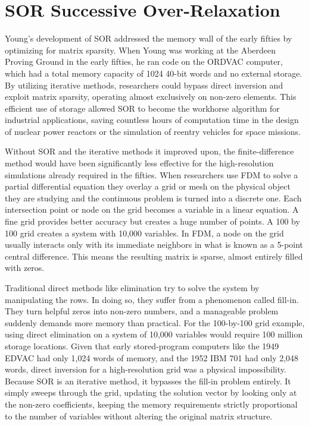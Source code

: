 \section{SOR Successive Over-Relaxation}

Young’s development of SOR addressed the memory wall of the early fifties by optimizing for matrix sparsity. When Young was working at the Aberdeen Proving Ground in the early fifties, he ran code on the ORDVAC computer, which had a total memory capacity of 1024 40-bit words and no external storage. By utilizing iterative methods, researchers could bypass direct inversion and exploit matrix sparsity, operating almost exclusively on non-zero elements. This efficient use of storage allowed SOR to become the workhorse algorithm for industrial applications, saving countless hours of computation time in the design of nuclear power reactors or the simulation of reentry vehicles for space missions. 

Without SOR and the iterative methods it improved upon, the finite-difference method would have been significantly less effective for the high-resolution simulations already required in the fifties. When researchers use FDM to solve a partial differential equation they overlay a grid or mesh on the physical object they are studying and the continuous problem is turned into a discrete one. Each intersection point or node on the grid becomes a variable in a linear equation. A fine grid provides better accuracy but creates a huge number of points. A 100 by 100 grid creates a system with 10,000 variables. In FDM, a node on the grid usually interacts only with its immediate neighbors in what is known as a 5-point central difference. This means the resulting matrix is sparse, almost entirely filled with zeros. 

Traditional direct methods like elimination try to solve the system by manipulating the rows. In doing so, they suffer from a phenomenon called fill-in. They turn helpful zeros into non-zero numbers, and a manageable problem suddenly demands more memory than practical. For the 100-by-100 grid example, using direct elimination on a system of 10,000 variables would require 100 million storage locations. Given that early stored-program computers like the 1949 EDVAC had only 1,024 words of memory, and the 1952 IBM 701 had only 2,048 words, direct inversion for a high-resolution grid was a physical impossibility. Because SOR is an iterative method, it bypasses the fill-in problem entirely. It simply sweeps through the grid, updating the solution vector by looking only at the non-zero coefficients, keeping the memory requirements strictly proportional to the number of variables without altering the original matrix structure.


